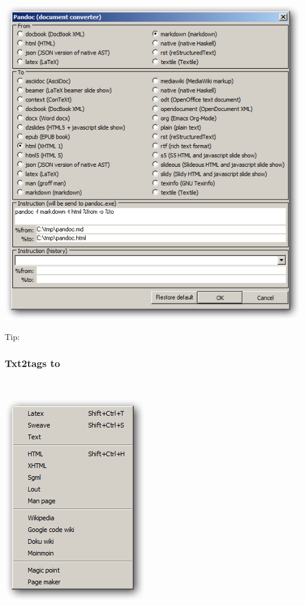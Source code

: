 \includegraphics[scale=.50]{./res/pandoc.png}

Tip: 


\newpage
\hypertarget{menu_tools_processing_conversion_txt2tags}{}
\subsubsection{Txt2tags to}\\

\includegraphics[scale=0.50]{./res/menu_tools_processing_conversion_txt2tags.png}\\

